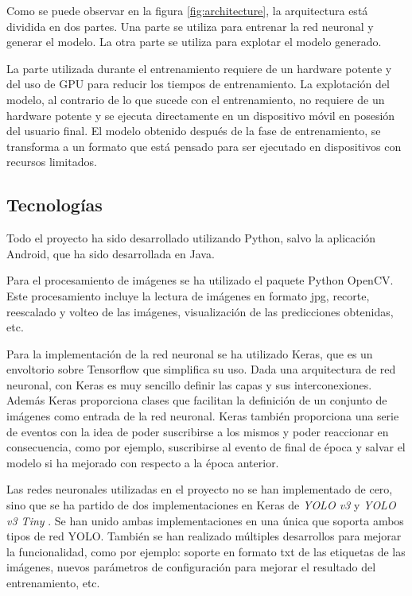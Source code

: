 Como se puede observar en la figura \ref{fig:architecture}, la arquitectura está dividida en dos partes. Una parte se utiliza para entrenar la red neuronal y generar el modelo. La otra parte se utiliza para explotar el modelo generado.

La parte utilizada durante el entrenamiento requiere de un hardware potente y del uso de GPU para reducir los tiempos de entrenamiento. La explotación del modelo, al contrario de lo que sucede con el entrenamiento, no requiere de un hardware potente y se ejecuta directamente en un dispositivo móvil en posesión del usuario final. El modelo obtenido después de la fase de entrenamiento, se transforma a un formato que está pensado para ser ejecutado en dispositivos con recursos limitados.

\subsection{Tecnologías}


Todo el proyecto ha sido desarrollado utilizando Python, salvo la aplicación Android, que ha sido desarrollada en Java.

Para el procesamiento de imágenes se ha utilizado el paquete Python OpenCV. Este procesamiento incluye la lectura de imágenes en formato jpg, recorte, reescalado y volteo de las imágenes, visualización de las predicciones obtenidas, etc.

Para la implementación de la red neuronal se ha utilizado Keras, que es un envoltorio sobre Tensorflow que simplifica su uso. Dada una arquitectura de red neuronal, con Keras es muy sencillo definir las capas y sus interconexiones. Además Keras proporciona clases que facilitan la definición de un conjunto de imágenes como entrada de la red neuronal. Keras también proporciona una serie de eventos con la idea de poder suscribirse a los mismos y poder reaccionar en consecuencia, como por ejemplo, suscribirse al evento de final de época y salvar el modelo si ha mejorado con respecto a la época anterior.

Las redes neuronales utilizadas en el proyecto no se han implementado de cero, sino que se ha partido de dos implementaciones en Keras de \textit{YOLO v3} \cite{s3_yolov3_orig} y \textit{YOLO v3 Tiny} \cite{s3_yolov3tiny_orig}. Se han unido ambas implementaciones en una única \cite{s3_yolo_dicastro} que soporta ambos tipos de red YOLO. También se han realizado múltiples desarrollos para mejorar la funcionalidad, como por ejemplo: soporte en formato txt de las etiquetas de las imágenes, nuevos parámetros de configuración para mejorar el resultado del entrenamiento, etc.

